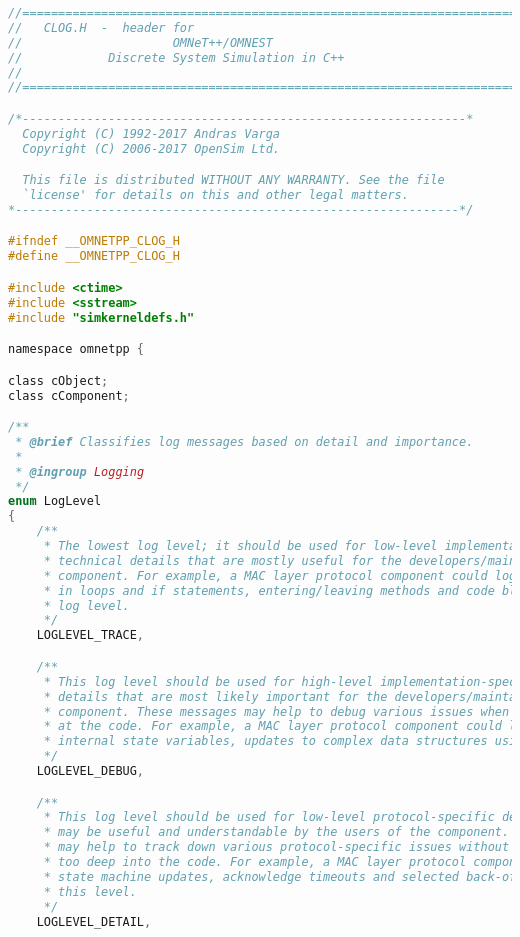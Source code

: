 \begin{lstlisting}[language=c]
//==========================================================================
//   CLOG.H  -  header for
//                     OMNeT++/OMNEST
//            Discrete System Simulation in C++
//
//==========================================================================

/*--------------------------------------------------------------*
  Copyright (C) 1992-2017 Andras Varga
  Copyright (C) 2006-2017 OpenSim Ltd.

  This file is distributed WITHOUT ANY WARRANTY. See the file
  `license' for details on this and other legal matters.
*--------------------------------------------------------------*/

#ifndef __OMNETPP_CLOG_H
#define __OMNETPP_CLOG_H

#include <ctime>
#include <sstream>
#include "simkerneldefs.h"

namespace omnetpp {

class cObject;
class cComponent;

/**
 * @brief Classifies log messages based on detail and importance.
 *
 * @ingroup Logging
 */
enum LogLevel
{
    /**
     * The lowest log level; it should be used for low-level implementation-specific
     * technical details that are mostly useful for the developers/maintainers of the
     * component. For example, a MAC layer protocol component could log control flow
     * in loops and if statements, entering/leaving methods and code blocks using this
     * log level.
     */
    LOGLEVEL_TRACE,

    /**
     * This log level should be used for high-level implementation-specific technical
     * details that are most likely important for the developers/maintainers of the
     * component. These messages may help to debug various issues when one is looking
     * at the code. For example, a MAC layer protocol component could log updates to
     * internal state variables, updates to complex data structures using this log level.
     */
    LOGLEVEL_DEBUG,

    /**
     * This log level should be used for low-level protocol-specific details that
     * may be useful and understandable by the users of the component. These messages
     * may help to track down various protocol-specific issues without actually looking
     * too deep into the code. For example, a MAC layer protocol component could log
     * state machine updates, acknowledge timeouts and selected back-off periods using
     * this level.
     */
    LOGLEVEL_DETAIL,


\end{lstlisting}
